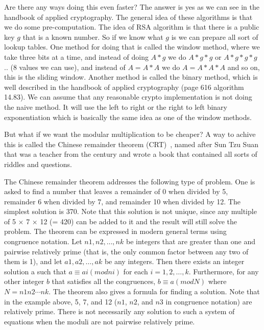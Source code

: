 Are there any ways doing this even faster? The answer is yes as we can see in the
handbook of applied cryptography. The general idea of
these algorithms is that we do some pre-computation. The idea of RSA algorithm is
that there is a public key $g$ that is a known number.
So if we know what $g$ is we can prepare all sort of lookup
tables. One method for doing that is called the window method,
where we take three bits at a time, and
instead of doing \(A*g\) we do \( A*g*g\) or \(A*g*g*g\) .. (8 values we can
use), and instead of \( A=A*A\) we do \(A=A*A*A\) and so on, this is the sliding
window. Another method is called the binary method, which is well described in
the handbook of applied cryptography (page 616 algorithm 14.83). We can assume 
that any reasonable crypto implementation is not doing the naive method.
It will use the left to right or the right to left binary exponentiation
which is basically the same idea as one of the window methods.

But what if we want the modular multiplication to be cheaper? A way to achive this 
is called the Chinese remainder theorem (CRT)~\cite{dingyi1996chinese}, named after 
Sun Tzu Suan that was a teacher from the  century and
wrote a book that contained all sorts of riddles and questions.

The Chinese remainder theorem addresses the following type of problem. 
One is asked to find a number that leaves a remainder of 0 when divided by 5, 
remainder 6 when divided by 7, and remainder 10 when divided by 12. 
The simplest solution is 370. Note that this solution is not unique, 
since any multiple of 5 × 7 × 12 (= 420) can be added to it and the result
 will still solve the problem.
The theorem can be expressed in modern general terms using congruence notation.
 Let $n1, n2, …, nk$ be integers that are greater than one and pairwise 
 relatively prime (that is, the only common factor between any two of them is 1),
and let $a1, a2, …, ak$ be any integers. 
Then there exists an integer solution a such that 
$a ≡ ai (mod ni)$ for each $i = 1, 2, …, k$. 
Furthermore, for any other integer $b$ that satisfies all the congruences, 
$b ≡ a (mod N)$ where $N = n1n2⋯nk$. 
The theorem also gives a formula for finding a solution. 
Note that in the example above, 5, 7, and 12 ($n1$, $n2$, and $n3$ 
in congruence notation) are relatively prime. 
There is not necessarily any solution to such a system of 
equations when the moduli are not pairwise relatively prime.


